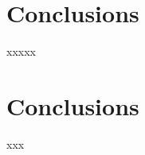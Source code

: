\documentclass{aa}
\begin{document}
\section{Conclusions}
 \label{sec:conclusions}

 xxxxx








\section{Conclusions}

xxx
\end{document}
